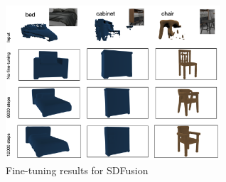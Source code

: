 \begin{figure}[H]
  \centering
  \includegraphics[width=80mm, scale=1]{images/image4.png}
  \caption{Fine-tuning results for SDFusion}
\end{figure}
